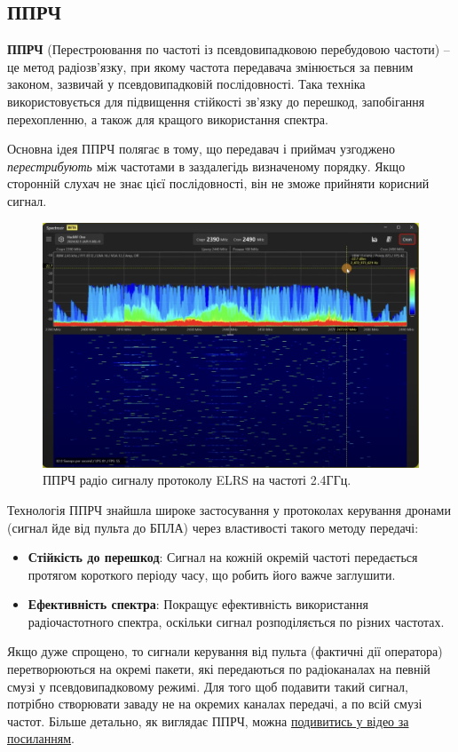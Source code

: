 \documentclass{article}
\begin{document}
\subsection{ППРЧ}

\textbf{ППРЧ} (Перестроювання по частоті із псевдовипадковою перебудовою частоти) -- це метод радіозв'язку, при якому частота передавача змінюється за певним законом, зазвичай у псевдовипадковій послідовності. Така техніка використовується для підвищення стійкості зв'язку до перешкод, запобігання перехопленню, а також для кращого використання спектра.

Основна ідея ППРЧ полягає в тому, що передавач і приймач узгоджено \textit{перестрибують} між частотами в заздалегідь визначеному порядку. Якщо сторонній слухач не знає цієї послідовності, він не зможе прийняти корисний сигнал.

\begin{figure}[H]
\centering
\includegraphics[width=0.7\linewidth]{images/freq-hope.png}
\caption{\label{fig:hf}ППРЧ радіо сигналу протоколу ELRS на частоті 2.4ГГц.}
\end{figure}

Технологія ППРЧ знайшла широке застосування у протоколах керування дронами (сигнал йде від пульта до БПЛА) через властивості такого методу передачі:
\begin{itemize}[noitemsep, topsep=8pt]
\item \textbf{Стійкість до перешкод}: Сигнал на кожній окремій частоті передається протягом короткого періоду часу, що робить його важче заглушити.
\item \textbf{Ефективність спектра}: Покращує ефективність використання радіочастотного спектра, оскільки сигнал розподіляється по різних частотах.
\end{itemize}

Якщо дуже спрощено, то сигнали керування від пульта (фактичні дії оператора) перетворюються на окремі пакети, які передаються по радіоканалах на певній смузі у псевдовипадковому режимі. Для того щоб подавити такий сигнал, потрібно створювати заваду не на окремих каналах передачі, а по всій смузі частот. Більше детально, як виглядає ППРЧ, можна \href{https://www.youtube.com/watch?v=REyNJcrZHII}{подивитись у відео за посиланням}.
\end{document}
